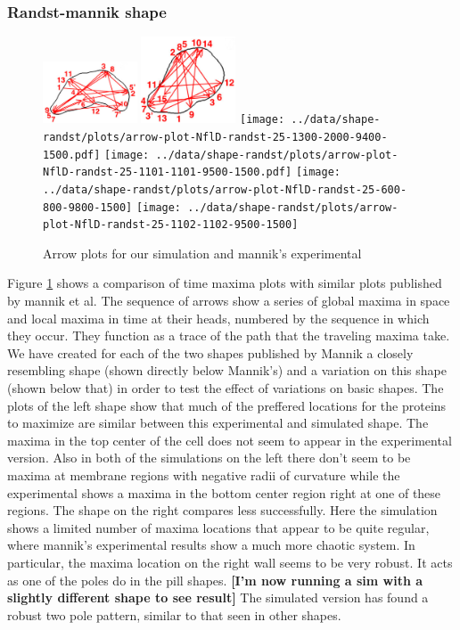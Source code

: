 \documentclass[letterpaper,twocolumn,amsmath,amssymb,pre]{revtex4-1}
\newcommand{\red}[1]{{\bf \color{red} #1}}
\newcommand{\fixme}[1]{\red{[#1]}}
\begin{document}
\subsubsection{Randst-mannik shape}
\begin{figure}
  \includegraphics[width=2.8cm]{../mannik-2.png}
  \includegraphics[width=2.8cm]{../mannik-1.png}
  \texttt{[image: ../data/shape-randst/plots/arrow-plot-NflD-randst-25-1300-2000-9400-1500.pdf]}
  \texttt{[image: ../data/shape-randst/plots/arrow-plot-NflD-randst-25-1101-1101-9500-1500.pdf]}
  \texttt{[image: ../data/shape-randst/plots/arrow-plot-NflD-randst-25-600-800-9800-1500]}
  \texttt{[image: ../data/shape-randst/plots/arrow-plot-NflD-randst-25-1102-1102-9500-1500]}
  \caption{Arrow plots for our simulation and mannik's experimental}
  \label{arrow-compare-mannik}
\end{figure}

Figure \ref{arrow-compare-mannik} shows a comparison of time maxima
plots with similar plots published by mannik et al.  The sequence of
arrows show a series of global maxima in space and local maxima in
time at their heads, numbered by the sequence in which they occur.
They function as a trace of the path that the traveling maxima take.
We have created for each of the two shapes published by Mannik a
closely resembling shape (shown directly below Mannik's) and a
variation on this shape (shown below that) in order to test the effect
of variations on basic shapes.  The plots of the left shape show that
much of the preffered locations for the proteins to maximize are
similar between this experimental and simulated shape.  The maxima in
the top center of the cell does not seem to appear in the experimental
version.  Also in both of the simulations on the left there don't seem
to be maxima at membrane regions with negative radii of curvature
while the experimental shows a maxima in the bottom center region
right at one of these regions.  The shape on the right compares less
successfully.  Here the simulation shows a limited number of maxima
locations that appear to be quite regular, where mannik's experimental
results show a much more chaotic system.  In particular, the maxima
location on the right wall seems to be very robust.  It acts as one of
the poles do in the pill shapes.  \fixme{I'm now running a sim with a
  slightly different shape to see result} The simulated version has
found a robust two pole pattern, similar to that seen in other shapes.
\end{document}
